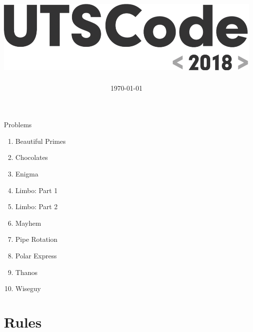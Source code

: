 \documentclass{article}
\title{\includegraphics[scale=0.8]{logo}}
\date{\today}
\begin{document}
\maketitle


\begin{center}
	Problems
	\begin{center}
		\begin{varwidth}{\textwidth}
			\begin{enumerate}[label=\Alph*]
				\item Beautiful Primes
				\item Chocolates
				\item Enigma
				\item Limbo: Part 1
				\item Limbo: Part 2
				\item Mayhem
				\item Pipe Rotation
				\item Polar Express
				\item Thanos
				\item Wiseguy
			\end{enumerate}
		\end{varwidth}
	\end{center}
\end{center}
\thispagestyle{empty}

\newpage
\thispagestyle{empty}


\section*{Rules}
\end{document}
